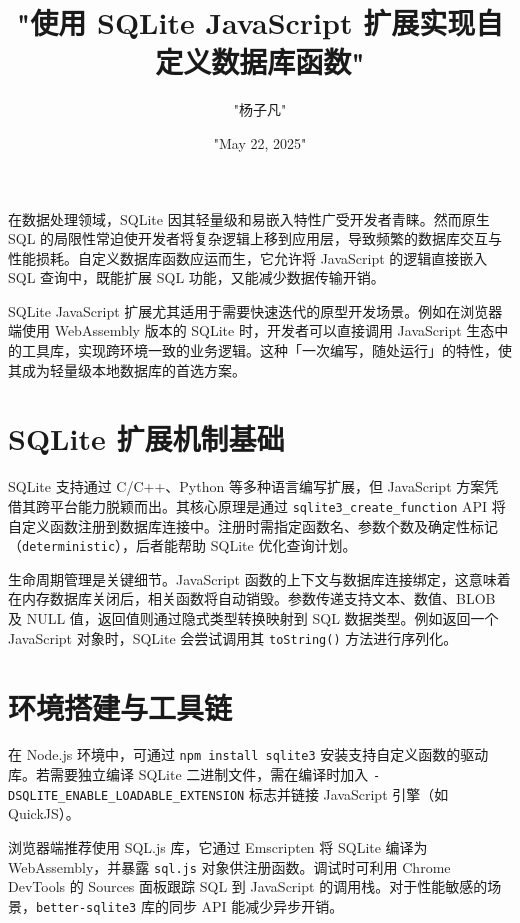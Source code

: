 \title{"使用 SQLite JavaScript 扩展实现自定义数据库函数"}
\author{"杨子凡"}
\date{"May 22, 2025"}
\maketitle
在数据处理领域，SQLite 因其轻量级和易嵌入特性广受开发者青睐。然而原生 SQL 的局限性常迫使开发者将复杂逻辑上移到应用层，导致频繁的数据库交互与性能损耗。自定义数据库函数应运而生，它允许将 JavaScript 的逻辑直接嵌入 SQL 查询中，既能扩展 SQL 功能，又能减少数据传输开销。\par
SQLite JavaScript 扩展尤其适用于需要快速迭代的原型开发场景。例如在浏览器端使用 WebAssembly 版本的 SQLite 时，开发者可以直接调用 JavaScript 生态中的工具库，实现跨环境一致的业务逻辑。这种「一次编写，随处运行」的特性，使其成为轻量级本地数据库的首选方案。\par
\chapter{SQLite 扩展机制基础}
SQLite 支持通过 C/C++、Python 等多种语言编写扩展，但 JavaScript 方案凭借其跨平台能力脱颖而出。其核心原理是通过 \verb!sqlite3_create_function! API 将自定义函数注册到数据库连接中。注册时需指定函数名、参数个数及确定性标记（\verb!deterministic!），后者能帮助 SQLite 优化查询计划。\par
生命周期管理是关键细节。JavaScript 函数的上下文与数据库连接绑定，这意味着在内存数据库关闭后，相关函数将自动销毁。参数传递支持文本、数值、BLOB 及 NULL 值，返回值则通过隐式类型转换映射到 SQL 数据类型。例如返回一个 JavaScript 对象时，SQLite 会尝试调用其 \verb!toString()! 方法进行序列化。\par
\chapter{环境搭建与工具链}
在 Node.js 环境中，可通过 \verb!npm install sqlite3! 安装支持自定义函数的驱动库。若需要独立编译 SQLite 二进制文件，需在编译时加入 \verb!-DSQLITE_ENABLE_LOADABLE_EXTENSION! 标志并链接 JavaScript 引擎（如 QuickJS）。\par
浏览器端推荐使用 SQL.js 库，它通过 Emscripten 将 SQLite 编译为 WebAssembly，并暴露 \verb!sql.js! 对象供注册函数。调试时可利用 Chrome DevTools 的 Sources 面板跟踪 SQL 到 JavaScript 的调用栈。对于性能敏感的场景，\verb!better-sqlite3! 库的同步 API 能减少异步开销。\par
